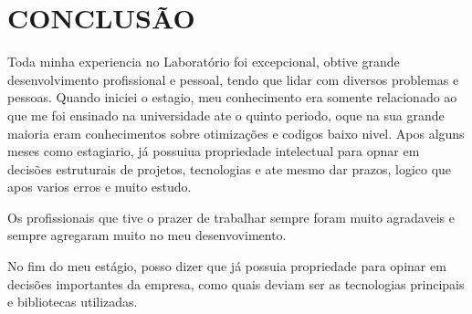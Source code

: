 \chapter{CONCLUSÃO}
\label{cap:conclusao}

Toda minha experiencia no Laboratório foi excepcional, obtive grande desenvolvimento profissional e pessoal, tendo que lidar com diversos problemas e pessoas.
Quando iniciei o estagio, meu conhecimento era somente relacionado ao que me foi ensinado na universidade ate o quinto periodo, oque na sua grande maioria eram conhecimentos sobre otimizações e codigos baixo nivel.
Apos alguns meses como estagiario, já possuiua propriedade intelectual para opnar em decisões estruturais de projetos, tecnologias e ate mesmo dar prazos, logico que apos varios erros e muito estudo.

Os profissionais que tive o prazer de trabalhar sempre foram muito agradaveis e sempre agregaram muito no meu desenvovimento.

No fim do meu estágio, posso dizer que já possuia propriedade para opinar em decisões importantes da empresa, como quais deviam ser as tecnologias principais e bibliotecas utilizadas.